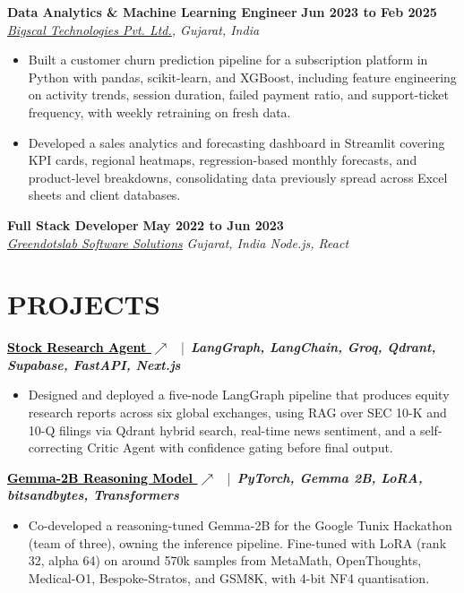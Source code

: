\documentclass[a4paper,10pt]{article}
\newcommand{\ulink}[2]{\href{#1}{\textcolor{black}{\underline{#2}}}}
\newcommand{\extlink}{$\nearrow$}
\newcommand{\jobtitle}[1]{{\color{headingcolor}\textbf{#1}}}
\begin{document}
\vspace{1pt}
\noindent
\jobtitle{Data Analytics \& Machine Learning Engineer} \hfill \textbf{Jun 2023 to Feb 2025}\\
\textit{\underline{Bigscal Technologies Pvt. Ltd.}, Gujarat, India}
\begin{itemize}
  \item Built a customer churn prediction pipeline for a subscription platform in Python with pandas, scikit-learn, and XGBoost, including feature engineering on activity trends, session duration, failed payment ratio, and support-ticket frequency, with weekly retraining on fresh data.
  \item Developed a sales analytics and forecasting dashboard in Streamlit covering KPI cards, regional heatmaps, regression-based monthly forecasts, and product-level breakdowns, consolidating data previously spread across Excel sheets and client databases.
\end{itemize}

\vspace{1pt}
\noindent
\jobtitle{Full Stack Developer} \hfill \textbf{May 2022 to Jun 2023}\\
\textit{\underline{Greendotslab Software Solutions}} \hfill \textit{Gujarat, India \hspace{0.5em}\textbar\hspace{0.5em} Node.js, React}

\section*{PROJECTS}

\noindent
\jobtitle{\ulink{https://equity.showdata.online}{Stock Research Agent \extlink}}
\ |\ \textit{\textbf{LangGraph, LangChain, Groq, Qdrant, Supabase, FastAPI, Next.js}}
\begin{itemize}
  \item Designed and deployed a five-node LangGraph pipeline that produces equity research reports across six global exchanges, using RAG over SEC 10-K and 10-Q filings via Qdrant hybrid search, real-time news sentiment, and a self-correcting Critic Agent with confidence gating before final output.
\end{itemize}

\vspace{2pt}
\noindent
\jobtitle{\ulink{https://www.kaggle.com/competitions/google-tunix-hackathon/writeups/new-writeup-1767829089071}{Gemma-2B Reasoning Model \extlink}}
\ |\ \textit{\textbf{PyTorch, Gemma 2B, LoRA, bitsandbytes, Transformers}}
\begin{itemize}
  \item Co-developed a reasoning-tuned Gemma-2B for the Google Tunix Hackathon (team of three), owning the inference pipeline. Fine-tuned with LoRA (rank 32, alpha 64) on around 570k samples from MetaMath, OpenThoughts, Medical-O1, Bespoke-Stratos, and GSM8K, with 4-bit NF4 quantisation.
\end{itemize}
\end{document}
